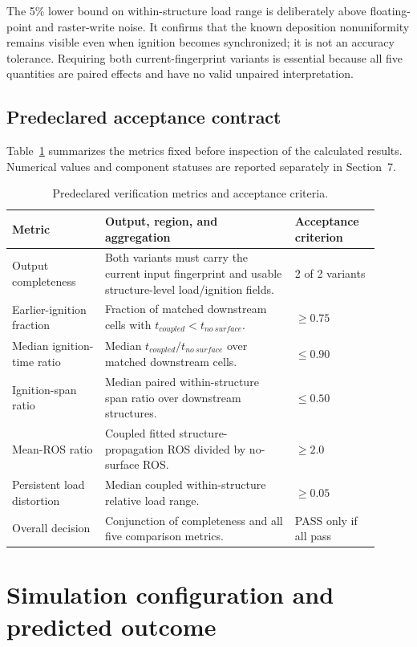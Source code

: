 The 5\% lower bound on within-structure load range is deliberately above
floating-point and raster-write noise.  It confirms that the known deposition
nonuniformity remains visible even when ignition becomes synchronized; it is
not an accuracy tolerance.  Requiring both current-fingerprint variants is
essential because all five quantities are paired effects and have no valid
unpaired interpretation.

\subsection{Predeclared acceptance contract}

Table~\ref{tab:acceptance-contract} summarizes the metrics fixed before
inspection of the calculated results. Numerical values and component statuses
are reported separately in Section~7.

\begin{table}[H]
\centering
\footnotesize
\caption{Predeclared verification metrics and acceptance criteria.}
\label{tab:acceptance-contract}
\begin{tabular}{@{}p{0.23\linewidth}p{0.47\linewidth}p{0.21\linewidth}@{}}
\toprule
Metric & Output, region, and aggregation & Acceptance criterion\\
\midrule
Output completeness & Both variants must carry the current input fingerprint and usable structure-level load/ignition fields. & 2 of 2 variants \\
Earlier-ignition fraction & Fraction of matched downstream cells with \(t_{coupled}<t_{no\ surface}\). & \(\ge0.75\) \\
Median ignition-time ratio & Median \(t_{coupled}/t_{no\ surface}\) over matched downstream cells. & \(\le0.90\) \\
Ignition-span ratio & Median paired within-structure span ratio over downstream structures. & \(\le0.50\) \\
Mean-ROS ratio & Coupled fitted structure-propagation ROS divided by no-surface ROS. & \(\ge2.0\) \\
Persistent load distortion & Median coupled within-structure relative load range. & \(\ge0.05\) \\
Overall decision & Conjunction of completeness and all five comparison metrics. & PASS only if all pass \\
\bottomrule
\end{tabular}
\end{table}

\section{Simulation configuration and predicted outcome}


